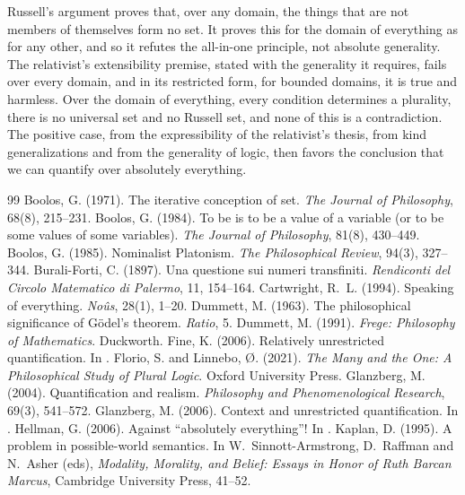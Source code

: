 \documentclass{situationist-preprint}
\begin{document}
Russell's argument proves that, over any domain, the things that are not members of themselves form no set. It proves this for the domain of everything as for any other, and so it refutes the all-in-one principle, not absolute generality. The relativist's extensibility premise, stated with the generality it requires, fails over every domain, and in its restricted form, for bounded domains, it is true and harmless. Over the domain of everything, every condition determines a plurality, there is no universal set and no Russell set, and none of this is a contradiction. The positive case, from the expressibility of the relativist's thesis, from kind generalizations and from the generality of logic, then favors the conclusion that we can quantify over absolutely everything.

\begin{thebibliography}{99}\small
{} Boolos, G. (1971). The iterative conception of set. \emph{The Journal of Philosophy}, 68(8), 215--231.
 Boolos, G. (1984). To be is to be a value of a variable (or to be some values of some variables). \emph{The Journal of Philosophy}, 81(8), 430--449.
 Boolos, G. (1985). Nominalist Platonism. \emph{The Philosophical Review}, 94(3), 327--344.
 Burali-Forti, C. (1897). Una questione sui numeri transfiniti. \emph{Rendiconti del Circolo Matematico di Palermo}, 11, 154--164.
 Cartwright, R.~L. (1994). Speaking of everything. \emph{No\^us}, 28(1), 1--20.
 Dummett, M. (1963). The philosophical significance of G\"odel's theorem. \emph{Ratio}, 5.
 Dummett, M. (1991). \emph{Frege: Philosophy of Mathematics}. Duckworth.
 Fine, K. (2006). Relatively unrestricted quantification. In \citet{RayoUzquiano2006}.
 Florio, S. and Linnebo, {\O}. (2021). \emph{The Many and the One: A Philosophical Study of Plural Logic}. Oxford University Press.
 Glanzberg, M. (2004). Quantification and realism. \emph{Philosophy and Phenomenological Research}, 69(3), 541--572.
 Glanzberg, M. (2006). Context and unrestricted quantification. In \citet{RayoUzquiano2006}.
 Hellman, G. (2006). Against \enquote{absolutely everything}! In \citet{RayoUzquiano2006}.
 Kaplan, D. (1995). A problem in possible-world semantics. In W.~Sinnott-Armstrong, D.~Raffman and N.~Asher (eds), \emph{Modality, Morality, and Belief: Essays in Honor of Ruth Barcan Marcus}, Cambridge University Press, 41--52.

\end{thebibliography}
\end{document}
